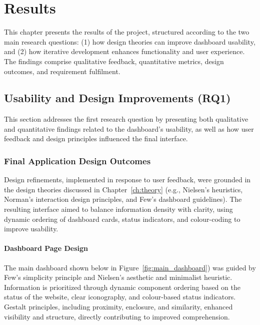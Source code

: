\chapter{Results}
\label{ch:results}

This chapter presents the results of the project, structured according to the two main research questions: (1) how design theories can improve dashboard usability, and (2) how iterative development enhances functionality and user experience. The findings comprise qualitative feedback, quantitative metrics, design outcomes, and requirement fulfilment. 

\section{Usability and Design Improvements (RQ1)}
This section addresses the first research question by presenting both qualitative and quantitative findings related to the dashboard’s usability, as well as how user feedback and design principles influenced the final interface.


\subsection{Final Application Design Outcomes}
\label{subsec:final_app_design_results}

Design refinements, implemented in response to user feedback, were grounded in the design theories discussed in Chapter~\ref{ch:theory} (e.g., Nielsen’s heuristics, Norman’s interaction design principles, and Few’s dashboard guidelines). The resulting interface aimed to balance information density with clarity, using dynamic ordering of dashboard cards, status indicators, and colour-coding to improve usability.

\subsubsection{Dashboard Page Design}
The main dashboard shown below in Figure~\ref{fig:main_dashboard}) was guided by Few’s simplicity principle and Nielsen’s aesthetic and minimalist heuristic. Information is prioritized through dynamic component ordering based on the status of the website, clear iconography, and colour-based status indicators. Gestalt principles, including proximity, enclosure, and similarity, enhanced visibility and structure, directly contributing to improved comprehension.


